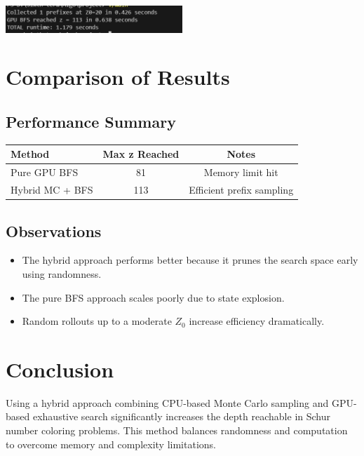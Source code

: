 \documentclass[12pt]{article}
\begin{document}
\vspace{1em}

\noindent
\begin{minipage}{\textwidth}
    \centering
    \includegraphics[width=0.5\textwidth]{images/figure_3.jpg}
\end{minipage}









\newpage

\section{Comparison of Results}

\subsection*{Performance Summary}
\begin{tabular}{|l|c|c|}
\hline
Method & Max z Reached & Notes \\
\hline
Pure GPU BFS & 81 & Memory limit hit \\
Hybrid MC + BFS & 113 & Efficient prefix sampling \\
\hline
\end{tabular}

\subsection*{Observations}
\begin{itemize}
  \item The hybrid approach performs better because it prunes the search space early using randomness.
  \item The pure BFS approach scales poorly due to state explosion.
  \item Random rollouts up to a moderate $Z_0$ increase efficiency dramatically.
\end{itemize}

\section{Conclusion}

Using a hybrid approach combining CPU-based Monte Carlo sampling and GPU-based exhaustive search significantly increases the depth reachable in Schur number coloring problems. This method balances randomness and computation to overcome memory and complexity limitations.
\end{document}
